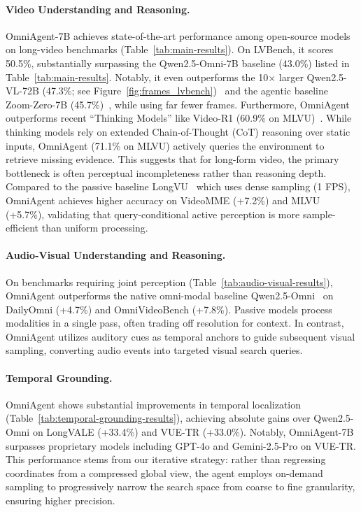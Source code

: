 \documentclass{article}
\theoremstyle{plain}
\theoremstyle{definition}
\theoremstyle{remark}
\begin{document}
\paragraph{Video Understanding and Reasoning.}
OmniAgent-7B achieves state-of-the-art performance among open-source models on long-video benchmarks (Table~\ref{tab:main-results}). On LVBench, it scores 50.5\%, substantially surpassing the Qwen2.5-Omni-7B baseline (43.0\%) listed in Table~\ref{tab:main-results}. Notably, it even outperforms the 10$\times$ larger Qwen2.5-VL-72B (47.3\%; see Figure~\ref{fig:frames_lvbench})~\cite{qwen2.5vl} and the agentic baseline Zoom-Zero-7B (45.7\%)~\cite{zoomzero}, while using far fewer frames.
Furthermore, OmniAgent outperforms recent ``Thinking Models'' like Video-R1 (60.9\% on MLVU)~\cite{feng2025video}. While thinking models rely on extended Chain-of-Thought (CoT) reasoning over static inputs, OmniAgent (71.1\% on MLVU) actively queries the environment to retrieve missing evidence. This suggests that for long-form video, the primary bottleneck is often perceptual incompleteness rather than reasoning depth.
Compared to the passive baseline LongVU~\cite{shen2024longvu} which uses dense sampling (1 FPS), OmniAgent achieves higher accuracy on VideoMME (+7.2\%) and MLVU (+5.7\%), validating that query-conditional active perception is more sample-efficient than uniform processing.

\paragraph{Audio-Visual Understanding and Reasoning.}
On benchmarks requiring joint perception (Table~\ref{tab:audio-visual-results}), OmniAgent outperforms the native omni-modal baseline Qwen2.5-Omni~\cite{qwen2.5omni} on DailyOmni (+4.7\%) and OmniVideoBench (+7.8\%). Passive models process modalities in a single pass, often trading off resolution for context. In contrast, OmniAgent utilizes auditory cues as temporal anchors to guide subsequent visual sampling, converting audio events into targeted visual search queries.

\paragraph{Temporal Grounding.}
OmniAgent shows substantial improvements in temporal localization (Table~\ref{tab:temporal-grounding-results}), achieving absolute gains over Qwen2.5-Omni on LongVALE (+33.4\%) and VUE-TR (+33.0\%). Notably, OmniAgent-7B surpasses proprietary models including GPT-4o and Gemini-2.5-Pro on VUE-TR. This performance stems from our iterative strategy: rather than regressing coordinates from a compressed global view, the agent employs on-demand sampling to progressively narrow the search space from coarse to fine granularity, ensuring higher precision.
\end{document}
